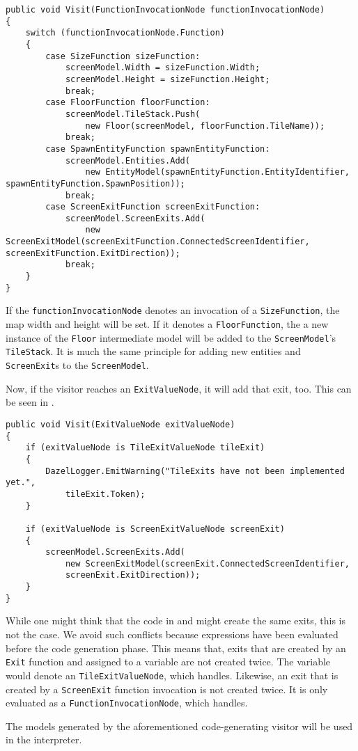 \begin{lstlisting}[language=CSharp, caption={FunctionInvocationNode \texttt{Visit} method.}, label={lst:finVisitSG}]
public void Visit(FunctionInvocationNode functionInvocationNode)
{
    switch (functionInvocationNode.Function)
    {
        case SizeFunction sizeFunction:
            screenModel.Width = sizeFunction.Width;
            screenModel.Height = sizeFunction.Height;
            break;
        case FloorFunction floorFunction:
            screenModel.TileStack.Push(
                new Floor(screenModel, floorFunction.TileName));
            break;
        case SpawnEntityFunction spawnEntityFunction:
            screenModel.Entities.Add(
                new EntityModel(spawnEntityFunction.EntityIdentifier, spawnEntityFunction.SpawnPosition));
            break;
        case ScreenExitFunction screenExitFunction:
            screenModel.ScreenExits.Add(
                new ScreenExitModel(screenExitFunction.ConnectedScreenIdentifier, screenExitFunction.ExitDirection));
            break;
    }
}    
\end{lstlisting}

If the \texttt{functionInvocationNode} denotes an invocation of a \texttt{SizeFunction}, the map width and height will be set. If it denotes a \texttt{FloorFunction}, the a new instance of the \texttt{Floor} intermediate model will be added to the \texttt{ScreenModel}'s \texttt{TileStack}. It is much the same principle for adding new entities and \texttt{ScreenExit}s to the \texttt{ScreenModel}.

Now, if the visitor reaches an \texttt{ExitValueNode}, it will add that exit, too. This can be seen in  .

\begin{lstlisting}[label={lst:visitExitNodeSG}, caption={The visit method for \texttt{ExitValueNode.}}, language=CSharp]
public void Visit(ExitValueNode exitValueNode)
{
    if (exitValueNode is TileExitValueNode tileExit)
    {
        DazelLogger.EmitWarning("TileExits have not been implemented yet.", 
            tileExit.Token);
    }

    if (exitValueNode is ScreenExitValueNode screenExit)
    {
        screenModel.ScreenExits.Add(
            new ScreenExitModel(screenExit.ConnectedScreenIdentifier, 
            screenExit.ExitDirection));
    }
}
\end{lstlisting}

While one might think that the code in  and  might create the same exits, this is not the case. We avoid such conflicts because expressions have been evaluated before the code generation phase. This means that, exits that are created by an \texttt{Exit} function and assigned to a variable are not created twice. The variable would denote an \texttt{TileExitValueNode}, which  handles. Likewise, an exit that is created by a \texttt{ScreenExit} function invocation is not created twice. It is only evaluated as a \texttt{FunctionInvocationNode}, which  handles.


The models generated by the aforementioned code-generating visitor will be used in the \dazel{} interpreter.